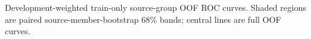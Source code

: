 Development-weighted train-only source-group OOF ROC curves. Shaded regions are paired source-member-bootstrap 68\% bands; central lines are full OOF curves.

